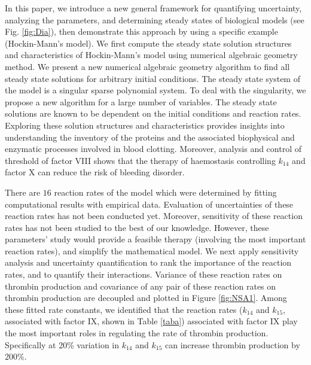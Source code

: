 In this paper, we introduce a new general framework for quantifying
uncertainty, analyzing the parameters, and determining steady states
of biological models (see Fig. \ref{fig:Dia}), then demonstrate this
approach by using a specific example (Hockin-Mann's model). We first
compute the steady state solution structures and characteristics of
Hockin-Mann's model \cite{HocJon02} using numerical algebraic
geometry method. We present a new numerical algebraic geometry
algorithm to find all steady state solutions
 for arbitrary initial conditions. The steady state system of the model
\cite{HocJon02} is a singular sparse polynomial system. To deal with
the singularity, we propose a new algorithm for a large number of
variables. The steady state solutions are known to be dependent on
the initial conditions and reaction rates. Exploring these solution
structures and characteristics provides insights into understanding
the inventory of the proteins and the associated biophysical and
enzymatic processes involved in blood clotting. Moreover, analysis
and control of threshold of factor VIII shows that the therapy of
haemostasis controlling $k_{14}$ and factor X can reduce the risk of
bleeding disorder.

There are $16$ reaction rates of the model \cite{HocJon02} which
were determined by fitting computational results with empirical
data. Evaluation of uncertainties of these reaction rates has not
been conducted yet. Moreover, sensitivity of these reaction rates
has not been studied to the best of our knowledge. However, these
parameters' study would provide a feasible therapy (involving the
most important reaction rates), and simplify the mathematical model.
We next apply sensitivity analysis and uncertainty quantification to
rank the importance of the reaction rates, and to quantify their
interactions. Variance of these reaction rates on thrombin
production and covariance of any pair of these reaction rates on
thrombin production are decoupled and plotted in Figure
\ref{fig:NSA1}. Among these fitted rate constants, we identified
that the reaction rates ($k_{14}$ and $k_{15}$, associated with
factor IX, shown in Table \ref{taba}) associated with factor IX play
the most important roles in regulating the rate of thrombin
production. Specifically at 20\% variation in $k_{14}$ and $k_{15}$
can increase thrombin production by 200\%.

